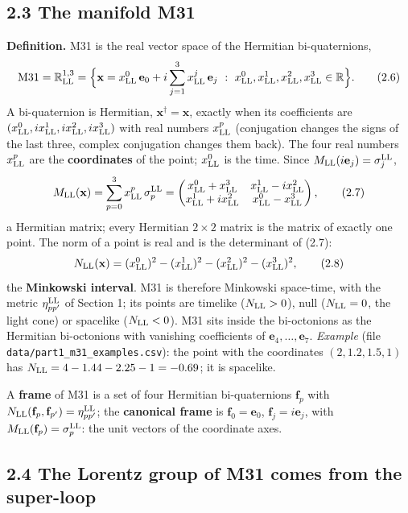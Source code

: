 \documentclass[
  10pt,
]{article}
\begin{document}
\hypertarget{the-manifold-m31}{%
\subsection{2.3 The manifold M31}\label{the-manifold-m31}}

\textbf{Definition.} M31 is the real vector space of the Hermitian
bi-quaternions,
\[\mathrm{M31}=\mathbb R^{1,3}_{\rm LL}=\Big\{\mathbf x=x^0_{\rm LL}\,\mathbf e_0+i\sum_{j=1}^3x^j_{\rm LL}\,\mathbf e_j\ :\ x^0_{\rm LL},x^1_{\rm LL},x^2_{\rm LL},x^3_{\rm LL}\in\mathbb R\Big\}.\tag{2.6}\]
A bi-quaternion is Hermitian, \(\mathbf x^\dagger=\mathbf x\), exactly
when its coefficients are
\((x^0_{\rm LL},ix^1_{\rm LL},ix^2_{\rm LL},ix^3_{\rm LL})\) with real
numbers \(x^p_{\rm LL}\) (conjugation changes the signs of the last
three, complex conjugation changes them back). The four real numbers
\(x^p_{\rm LL}\) are the \textbf{coordinates} of the point;
\(x^0_{\rm LL}\) is the time. Since
\(M_{\rm LL}(i\mathbf e_j)=\sigma^{\rm LL}_j\),
\[M_{\rm LL}(\mathbf x)=\sum_{p=0}^3x^p_{\rm LL}\,\sigma^{\rm LL}_p=\begin{pmatrix}x^0_{\rm LL}+x^3_{\rm LL}&x^1_{\rm LL}-ix^2_{\rm LL}\\x^1_{\rm LL}+ix^2_{\rm LL}&x^0_{\rm LL}-x^3_{\rm LL}\end{pmatrix},\tag{2.7}\]
a Hermitian matrix; every Hermitian \(2\times2\) matrix is the matrix of
exactly one point. The norm of a point is real and is the determinant of
(2.7):
\[N_{\rm LL}(\mathbf x)=(x^0_{\rm LL})^2-(x^1_{\rm LL})^2-(x^2_{\rm LL})^2-(x^3_{\rm LL})^2,\tag{2.8}\]
the \textbf{Minkowski interval}. M31 is therefore Minkowski space-time,
with the metric \(\eta^{\rm LL}_{pp'}\) of Section 1; its points are
timelike (\(N_{\rm LL}>0\)), null (\(N_{\rm LL}=0\), the light cone) or
spacelike (\(N_{\rm LL}<0\)). M31 sits inside the bi-octonions as the
Hermitian bi-octonions with vanishing coefficients of
\(\mathbf e_4,\dots,\mathbf e_7\). \emph{Example} (file
\texttt{data/part1\_m31\_examples.csv}): the point with the coordinates
\((2,1.2,1.5,1)\) has \(N_{\rm LL}=4-1.44-2.25-1=-0.69\); it is
spacelike.

A \textbf{frame} of M31 is a set of four Hermitian bi-quaternions
\(\mathbf f_p\) with
\(N_{\rm LL}(\mathbf f_p,\mathbf f_{p'})=\eta^{\rm LL}_{pp'}\); the
\textbf{canonical frame} is \(\mathbf f_0=\mathbf e_0\),
\(\mathbf f_j=i\mathbf e_j\), with
\(M_{\rm LL}(\mathbf f_p)=\sigma^{\rm LL}_p\): the unit vectors of the
coordinate axes.

\hypertarget{the-lorentz-group-of-m31-comes-from-the-super-loop}{%
\subsection{2.4 The Lorentz group of M31 comes from the
super-loop}\label{the-lorentz-group-of-m31-comes-from-the-super-loop}}
\end{document}
